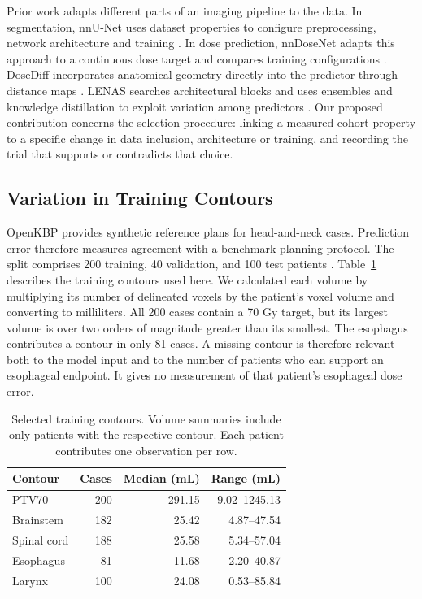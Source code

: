 \documentclass[letterpaper]{article}
\begin{document}
Prior work adapts different parts of an imaging pipeline to the data. In segmentation, nnU-Net uses dataset properties to configure preprocessing, network architecture and training \citep{nnunet}. In dose prediction, nnDoseNet adapts this approach to a continuous dose target and compares training configurations \citep{nndose}. DoseDiff incorporates anatomical geometry directly into the predictor through distance maps \citep{dosediff}. LENAS searches architectural blocks and uses ensembles and knowledge distillation to exploit variation among predictors \citep{lenas}. Our proposed contribution concerns the selection procedure: linking a measured cohort property to a specific change in data inclusion, architecture or training, and recording the trial that supports or contradicts that choice.

\subsection{Variation in Training Contours}
OpenKBP provides synthetic reference plans for head-and-neck cases. Prediction error therefore measures agreement with a benchmark planning protocol. The split comprises 200 training, 40 validation, and 100 test patients \citep{openkbp}. Table~\ref{tab:cohort} describes the training contours used here. We calculated each volume by multiplying its number of delineated voxels by the patient's voxel volume and converting to milliliters. All 200 cases contain a 70 Gy target, but its largest volume is over two orders of magnitude greater than its smallest. The esophagus contributes a contour in only 81 cases. A missing contour is therefore relevant both to the model input and to the number of patients who can support an esophageal endpoint. It gives no measurement of that patient's esophageal dose error.

\begin{table}[t]
\centering
\begin{tabular}{lrrr}
\toprule
Contour & Cases & Median (mL) & Range (mL)\\
\midrule
PTV70 & 200 & 291.15 & 9.02--1245.13\\
Brainstem & 182 & 25.42 & 4.87--47.54\\
Spinal cord & 188 & 25.58 & 5.34--57.04\\
Esophagus & 81 & 11.68 & 2.20--40.87\\
Larynx & 100 & 24.08 & 0.53--85.84\\
\bottomrule
\end{tabular}
\caption{Selected training contours. Volume summaries include only patients with the respective contour. Each patient contributes one observation per row.}
\label{tab:cohort}
\end{table}
\end{document}
